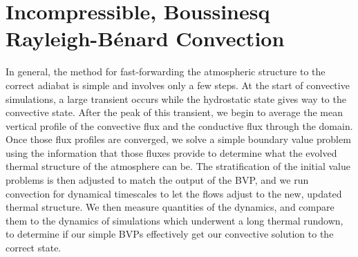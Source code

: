 \documentclass[aps, pre, onecolumn, nofootinbib, notitlepage, groupedaddress, amsfonts, amssymb, amsmath, longbibliography]{revtex4-1}
\newcommand{\RB}{Rayleigh-B\'{e}nard }
\begin{document}
\section{Incompressible, Boussinesq \RB Convection}
\label{sec:experiment}
In general, the method for fast-forwarding the atmospheric structure to the correct adiabat is
simple and involves only a few steps.  At the start of convective simulations, a large transient
occurs while the hydrostatic state gives way to the convective state.  After the peak of this
transient, we begin to average the mean vertical profile of the convective flux and the conductive
flux through the domain.  Once those flux profiles are converged, we solve a simple 
boundary value problem using the information that those fluxes provide to determine what the
evolved thermal structure of the atmosphere can be.  The stratification of the initial value
problems is then adjusted to match the output of the BVP, and we run convection for dynamical
timescales to let the flows adjust to the new, updated thermal structure.  We then measure
quantities of the dynamics, and compare them to the dynamics of simulations which underwent a
long thermal rundown, to determine if our simple BVPs effectively get our convective solution
to the correct state.
\end{document}
